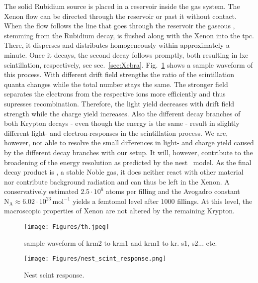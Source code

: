 The solid Rubidium source is placed in a reservoir inside the gas system.
The Xenon flow can be directed through the reservoir or past it without contact.
When the flow follows the line that goes through the reservoir the gaseous , stemming from the Rubidium decay, is flushed along with the Xenon into the \gls{tpc}.
There, it disperses and distributes homogeneously within approximately a minute.
Once it decays, the second decay follows promptly, both resulting in \gls{lxe} scintillation, respectively, see sec.~\ref{sec:Xebra}.
Fig.~\ref{fig:waveform_kr} shows a sample waveform of this process.
With different drift field strengths the ratio of the scintillation quanta changes while the total number stays the same.
The stronger field separates the electrons from the respective ions more efficiently and thus supresses recombination.
Therefore, the light yield decreases with drift field strength while the charge yield increases.
Also the different decay branches of both Krypton decays - even though the energy is the same - result in slightly different light- and electron-responses in the scintillation process.
We are, however, not able to resolve the small differences in light- and charge yield caused by the different decay branches with our setup.
It will, however, contribute to the broadening of the energy resolution as predicted by the \gls{nest}~\cite{Szydagis13} model.
As the final decay product is , a stable Noble gas, it does neither react with other material nor contribute background radiation and can thus be left in the Xenon.
A conservatively estimated $ 2.5\cdot10^{6} $ atoms per filling and the Avogadro constant $ \mathrm{N}_\mathrm{A} \approx 6.02\cdot10^{23}\,\mathrm{mol}^{-1} $ yields a femtomol level after 1000 fillings.
At this level, the macroscopic properties of Xenon are not altered by the remaining Krypton.


\begin{figure}
    \centering
    \texttt{[image: Figures/th.jpeg]}  %
    \caption[Waveform Krypton]{
        sample waveform of krm2 to krm1 and krm1 to kr. s1, s2... etc.
    }
    \label{fig:waveform_kr}
\end{figure}


\begin{figure}
    \centering
    \texttt{[image: Figures/nest\_scint\_response.png]}  %
    \caption[Nest scint response]{
        Nest scint response.\cite{Szydagis13}
    } %
    \label{fig:scint_response_nest}
\end{figure}


